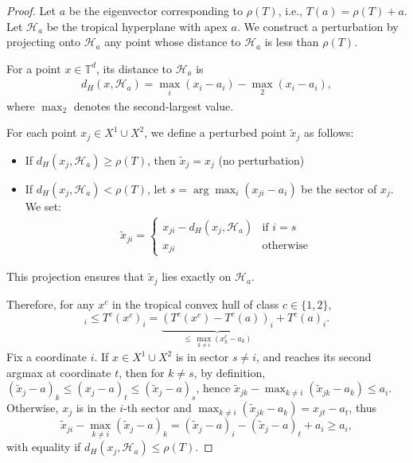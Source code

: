 \documentclass{article}
\renewcommand{\geq}{\geqslant}
\newcommand{\trop}{\mathbb{T}}
\begin{document}
\begin{proof}
Let $a$ be the eigenvector corresponding to $\rho(T)$, i.e., $T(a) = \rho(T) + a$. Let $\mathcal{H}_a$ be the tropical hyperplane with apex $a$. We construct a perturbation by projecting onto $\mathcal{H}_a$ any point whose distance to $\mathcal{H}_a$ is less than $\rho(T)$.

For a point $x \in \trop^d$, its distance to $\mathcal{H}_a$ is
\begin{align}
d_H(x, \mathcal{H}_a) = \max_i(x_i - a_i) - \operatorname{\max}_2(x_i - a_i),
\end{align}
where $\operatorname{\max}_2$ denotes the second-largest value.

For each point $x_j \in X^1 \cup X^2$, we define a perturbed point $\tilde{x}_j$ as follows:
\begin{itemize}
\item If $d_H(x_j, \mathcal{H}_a) \geq \rho(T)$, then $\tilde{x}_j = x_j$ (no perturbation)
\item If $d_H(x_j, \mathcal{H}_a) < \rho(T)$, let $s = \arg\max_i(x_{ji} - a_i)$ be the sector of $x_j$. We set:
  \begin{align}
  \tilde{x}_{ji} = \begin{cases}
  x_{ji} - d_H(x_j, \mathcal{H}_a) & \text{if } i = s \\
  x_{ji} & \text{otherwise}
  \end{cases}
  \end{align}
\end{itemize}

This projection ensures that $\tilde{x}_j$ lies exactly on $\mathcal{H}_a$.

Therefore, for any $x^{c}$ in the tropical convex hull of class $c\in\{1,2\}$,
\begin{equation}
[x^{c}]_{i}\le T^{c}(x^{c})_{i}=\underbrace{\left(T^{c}(x^{c})-T^{c}(a)\right)_{i}}_{\le\,\max_{k\ne i}(x_{k}^{c}-a_{k})}+T^{c}(a)_{i}.\label{eq:major}
\end{equation}
Fix a coordinate $i$. If $x\in X^{1}\cup X^{2}$ is in sector $s\ne i$, and reaches its second argmax at coordinate $t$, then for $k\ne s$, by definition,
$(\tilde{x}_{j}-a)_{k}\le(x_{j}-a)_{t}\le(\tilde{x}_{j}-a)_{s}$,
hence $\tilde{x}_{jk}-\max_{k\ne i}(\tilde{x}_{jk}-a_{k})\le a_{i}$.
Otherwise, $x_{j}$ is in the $i$-th sector and $\max_{k\ne i}(\tilde{x}_{jk}-a_{k})=x_{jt}-a_{t}$,
thus
\[
\tilde{x}_{ji}-\max_{k\ne i}(\tilde{x}_{j}-a)_{k}=(\tilde{x}_{j}-a)_{i}-(\tilde{x}_{j}-a)_{t}+a_{i}\ge a_{i},
\]
with equality if $d_{H}\left(x_{j},\mathcal{H}_{a}\right)\le\rho(T)$.


\end{proof}
\end{document}
